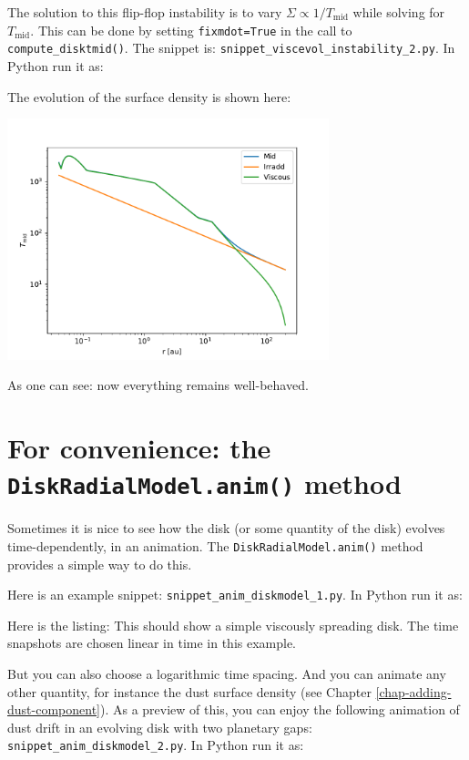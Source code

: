 \documentclass{book}
\newcommand{\code}[1]{{\small\tt #1}}
\begin{document}
The solution to this flip-flop instability is to vary $\Sigma \propto
1/T_{\mathrm{mid}}$ while solving for $T_{\mathrm{mid}}$. This can be done by
setting \code{fixmdot=True} in the call to \code{compute\_disktmid()}.
The snippet is: \code{snippet\_viscevol\_instability\_2.py}. In Python run it as:
\begin{codebox}
\end{codebox}
The evolution of the surface density is shown
here:\\ \centerline{\includegraphics[width=0.7\textwidth]{../snippets/fig_snippet_viscevol_instability_2_1.pdf}}
As one can see: now everything remains well-behaved.



\section{For convenience: the {\tt DiskRadialModel.anim()} method}\label{sec-disk-standard-anim}
Sometimes it is nice to see how the disk (or some quantity of the disk)
evolves time-dependently, in an animation. The \code{DiskRadialModel.anim()}
method provides a simple way to do this.

Here is an example snippet: \code{snippet\_anim\_diskmodel\_1.py}. In Python run
it as:
\begin{codebox}
\end{codebox}
Here is the listing: 
This should show a simple viscously spreading disk. The time snapshots are
chosen linear in time in this example.

But you can also choose a logarithmic time spacing. And you can animate any other
quantity, for instance the dust surface density (see Chapter
\ref{chap-adding-dust-component}). As a preview of this, you can enjoy the
following animation of dust drift in an evolving disk with two planetary gaps:
\code{snippet\_anim\_diskmodel\_2.py}. In Python run it as:
\begin{codebox}
\end{codebox}
\end{document}

